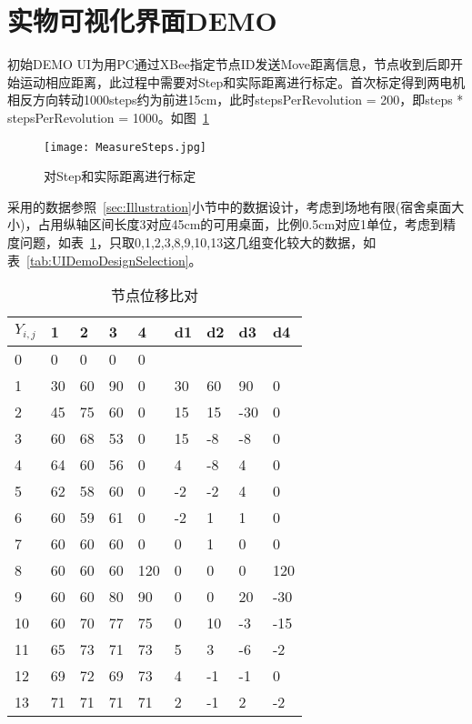 \section{实物可视化界面DEMO}

初始DEMO UI为用PC通过XBee指定节点ID发送Move距离信息，节点收到后即开始运动相应距离，此过程中需要对Step和实际距离进行标定。首次标定得到两电机相反方向转动1000steps约为前进15cm，此时stepsPerRevolution = 200，即steps * stepsPerRevolution = 1000。如图~\ref{fig:MeasureSteps}

\begin{figure}[htbp]
    \centering
    \texttt{[image: MeasureSteps.jpg]}
    \caption{对Step和实际距离进行标定}
    \label{fig:MeasureSteps}
\end{figure}

采用的数据参照~\ref{sec:Illustration}小节中的数据设计，考虑到场地有限(宿舍桌面大小)，占用纵轴区间长度3对应45cm的可用桌面，比例0.5cm对应1单位，考虑到精度问题，如表~\ref{tab:UIDemoDesign}，只取0,1,2,3,8,9,10,13这几组变化较大的数据，如表~\ref{tab:UIDemoDesignSelection}。

\begin{table}[htbp]
    \centering
    \begin{tabular}{|l|l|l|l|l|l|l|l|l|}
    \hline
    $Y_{i,j}$
       & 1  & 2  & 3  & 4   & d1 & d2 & d3  & d4  \\ \hline
    0  & 0  & 0  & 0  & 0   &    &    &     &     \\ \hline
    1  & 30 & 60 & 90 & 0   & 30 & 60 & 90  & 0   \\ \hline
    2  & 45 & 75 & 60 & 0   & 15 & 15 & -30 & 0   \\ \hline
    3  & 60 & 68 & 53 & 0   & 15 & -8 & -8  & 0   \\ \hline
    4  & 64 & 60 & 56 & 0   & 4  & -8 & 4   & 0   \\ \hline
    5  & 62 & 58 & 60 & 0   & -2 & -2 & 4   & 0   \\ \hline
    6  & 60 & 59 & 61 & 0   & -2 & 1  & 1   & 0   \\ \hline
    7  & 60 & 60 & 60 & 0   & 0  & 1  & 0   & 0   \\ \hline
    8  & 60 & 60 & 60 & 120 & 0  & 0  & 0   & 120 \\ \hline
    9  & 60 & 60 & 80 & 90  & 0  & 0  & 20  & -30 \\ \hline
    10 & 60 & 70 & 77 & 75  & 0  & 10 & -3  & -15 \\ \hline
    11 & 65 & 73 & 71 & 73  & 5  & 3  & -6  & -2  \\ \hline
    12 & 69 & 72 & 69 & 73  & 4  & -1 & -1  & 0   \\ \hline
    13 & 71 & 71 & 71 & 71  & 2  & -1 & 2   & -2  \\ \hline
    \end{tabular}
    \caption{节点位移比对}
    \label{tab:UIDemoDesign}
\end{table}


